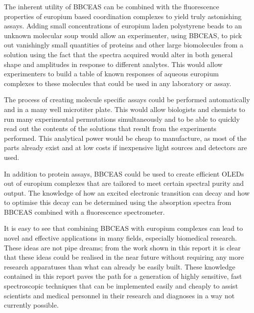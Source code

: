 The inherent utility of \ac{BBCEAS} can be combined with the fluorescence
properties of europium based coordination complexes to yield truly astonishing
assays. Adding small concentrations of europium laden polystyrene beads to
an unknown molecular soup would allow an experimenter, using \ac{BBCEAS}, to
pick out vanishingly small quantities of proteins and other large biomolecules
from a solution using the fact that the spectra acquired would alter in both
general shape and amplitudes in response to different analytes. This would
allow experimenters to build a table of known responses of aqueous europium
complexes to these molecules that could be used in any laboratory or assay.

The process of creating molecule specific assays could be performed
automatically and in a many well microtiter plate. This would allow biologists
and chemists to run many experimental permutations simultaneously and to be
able to quickly read out the contents of the solutions that result from the
experiments performed. This analytical power would be cheap to manufacture, as
most of the parts already exist and at low costs if inexpensive light sources
and detectors are used.

In addition to protein assays, \ac{BBCEAS} could be used to create efficient
\acp{OLED} out of europium complexes that are tailored to meet certain
spectral purity and output. The knowledge of how an excited electronic
transition can decay and how to optimise this decay can be determined
using the absorption spectra from \ac{BBCEAS} combined with a fluorescence
spectrometer.

It is easy to see that combining \ac{BBCEAS} with europium complexes can lead
to novel and effective applications in many fields, especially biomedical
research. These ideas are not pipe dreams; from the work shown in this report
it is clear that these ideas could be realised in the near future without
requiring any more research apparatuses than what can already be easily built.
These knowledge contained in this report paves the path for a generation of
highly sensitive, fast spectroscopic techniques that can be implemented easily
and cheaply to assist scientists and medical personnel in their research and
diagnoses in a way not currently possible.
